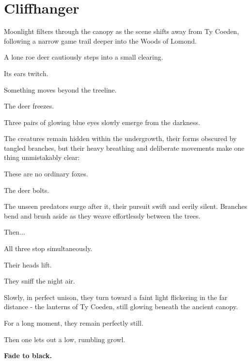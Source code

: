\section*{Cliffhanger}
\begin{DndReadAloud}
	Moonlight filters through the canopy as the scene shifts away from Ty Coeden, following a narrow game trail deeper into the Woods of Lomond.

		A lone roe deer cautiously steps into a small clearing.
	
	Its ears twitch.
	
	Something moves beyond the treeline.
	
	The deer freezes.
	
	Three pairs of glowing blue eyes slowly emerge from the darkness.
	
	The creatures remain hidden within the undergrowth, their forms obscured by tangled branches, but their heavy breathing and deliberate movements make one thing unmistakably clear:
	
	These are no ordinary foxes.
	
	The deer bolts.
	
	The unseen predators surge after it, their pursuit swift and eerily silent. Branches bend and brush aside as they weave effortlessly between the trees.
	
	Then...
	
	All three stop simultaneously.
	
	Their heads lift.
	
	They sniff the night air.
	
	Slowly, in perfect unison, they turn toward a faint light flickering in the far distance - the lanterns of Ty Coeden, still glowing beneath the ancient canopy.
	
	For a long moment, they remain perfectly still.
	
	Then one lets out a low, rumbling growl.
	
	\textbf{Fade to black.}
\end{DndReadAloud}